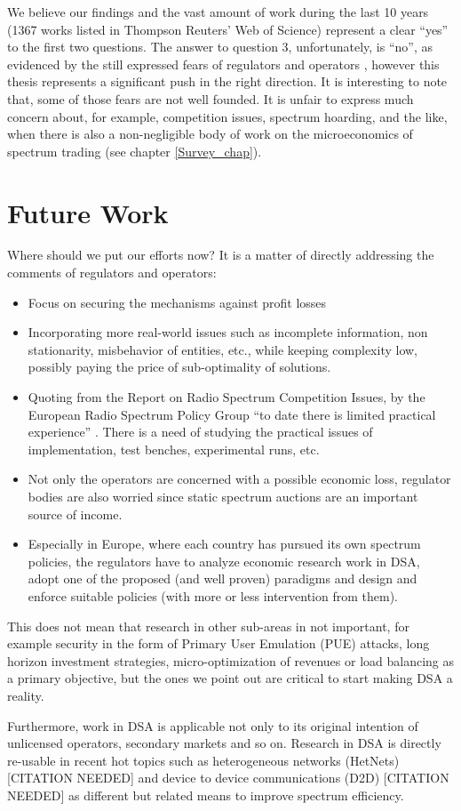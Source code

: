 We believe our findings and the vast amount of work during the last 10 years (1367 works listed in Thompson Reuters' Web of Science) represent a clear \enquote{yes} to the first two questions. The answer to question 3, unfortunately, is \enquote{no}, as evidenced by the still expressed fears of regulators and operators \cite{ref:Kelly2012}, however this thesis represents a significant push in the right direction. It is interesting to note that, some of those fears are not well founded. It is unfair to express much concern about, for example, competition issues, spectrum hoarding, and the like, when there is also a non-negligible body of work on the microeconomics of spectrum trading (see chapter \ref{Survey_chap}).

\section{Future Work}
Where should we put our efforts now? It is a matter of directly addressing the comments of regulators and operators:
\begin{itemize}
\item Focus on securing the mechanisms against profit losses
\item Incorporating more real-world issues such as incomplete information, non stationarity, misbehavior of entities, etc., while keeping complexity low, possibly paying the price of sub-optimality of solutions. 
\item Quoting from the Report on Radio Spectrum Competition Issues, by the European Radio Spectrum Policy Group \enquote{to date there is limited practical experience} \cite{ref:RSPG2009}. There is a need of studying the practical issues of implementation, test benches, experimental runs, etc. 
\item Not only the operators are concerned with a possible economic loss, regulator bodies are also worried since static spectrum auctions are an important source of income. 
\item Especially in Europe, where each country has pursued its own spectrum policies, the regulators have to analyze economic research work in DSA, adopt one of the proposed (and well proven) paradigms and design and enforce suitable policies (with more or less intervention from them).
\end{itemize}
This does not mean that research in other sub-areas in not important, for example security in the form of Primary User Emulation (PUE) attacks, long horizon investment strategies, micro-optimization of revenues or load balancing as a primary objective, but the ones we point out are critical to start making DSA a reality. 

Furthermore, work in DSA is applicable not only to its original intention of unlicensed operators, secondary markets and so on. Research in DSA is directly re-usable in recent hot topics such as heterogeneous networks (HetNets) [CITATION NEEDED] and device to device communications (D2D) [CITATION NEEDED] as different but related means to improve spectrum efficiency.




